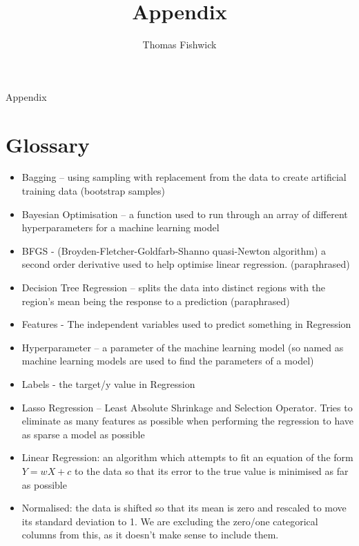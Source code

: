 \documentclass[a4pape, 11pt, english]{article}
\title{Appendix}
\author{Thomas Fishwick}
\begin{document}
\begin{center}
\huge
Appendix
\end{center}

\section{Glossary}
\begin{itemize}
	\addtolength\itemsep{-4mm}	

	\item Bagging – using sampling with replacement from the data to create artificial training data (bootstrap samples)
	\item Bayesian Optimisation – a function used to run through an array of different hyperparameters for a machine learning model
	\item BFGS - (Broyden-Fletcher-Goldfarb-Shanno quasi-Newton algorithm) a second order derivative used to help optimise linear regression.\citep{brownlee_gentle_2021} (paraphrased)
	\item Decision Tree Regression – splits the data into distinct regions with the region’s mean being the response to a prediction \citep{james_gareth_introduction_2021} (paraphrased)
	\item Features - The independent variables used to predict something in Regression
	\item Hyperparameter – a parameter of the machine learning model (so named as machine learning models are used to find the parameters of a model)
	\item Labels - the target/y value in Regression
	\item Lasso Regression – Least Absolute Shrinkage and Selection Operator. Tries to eliminate as many features as possible when performing the regression to have as sparse a model as possible \citep{stephanie_lasso_2015}
	\item Linear Regression: an algorithm which attempts to fit an equation of the form $Y = wX + c$ to the data so that its error to the true value is minimised as far as possible
	\item Normalised: the data is shifted so that its mean is zero and rescaled to move its standard deviation to 1. We are excluding the zero/one categorical columns from this, as it doesn’t make sense to include them.

\end{itemize}
\end{document}
